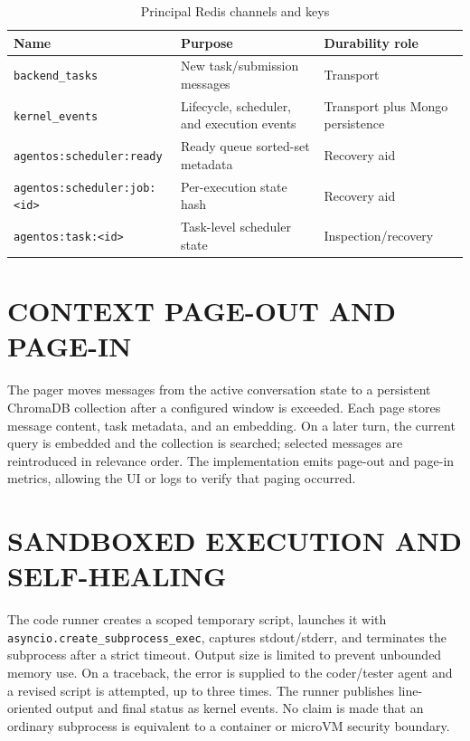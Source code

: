 \begin{table}[!htbp]
\centering
\caption{Principal Redis channels and keys}
\label{tab:rediskeys}
\begin{tabularx}{\textwidth}{|>{\centering\arraybackslash}p{}|>{\centering\arraybackslash}X|>{\centering\arraybackslash}p{}|}
\hline
\textbf{Name} & \textbf{Purpose} & \textbf{Durability role} \\ \hline
\texttt{backend\_tasks} & New task/submission messages & Transport \\ \hline
\texttt{kernel\_events} & Lifecycle, scheduler, and execution events & Transport plus Mongo persistence \\ \hline
\texttt{agentos:\allowbreak scheduler:\allowbreak ready} & Ready queue sorted-set metadata & Recovery aid \\ \hline
\texttt{agentos:\allowbreak scheduler:\allowbreak job:\allowbreak <id>} & Per-execution state hash & Recovery aid \\ \hline
\texttt{agentos:\allowbreak task:\allowbreak <id>} & Task-level scheduler state & Inspection/recovery \\ \hline
\end{tabularx}
\end{table}

\FloatBarrier
\par\vspace*{\baselineskip}
\section{\uppercase{Context Page-Out and Page-In}}
The pager moves messages from the active conversation state to a persistent ChromaDB collection after a configured window is exceeded. Each page stores message content, task metadata, and an embedding. On a later turn, the current query is embedded and the collection is searched; selected messages are reintroduced in relevance order. The implementation emits page-out and page-in metrics, allowing the UI or logs to verify that paging occurred.

\section{\uppercase{Sandboxed Execution and Self-Healing}}
The code runner creates a scoped temporary script, launches it with \texttt{asyncio.create\_subprocess\_exec}, captures stdout/stderr, and terminates the subprocess after a strict timeout. Output size is limited to prevent unbounded memory use. On a traceback, the error is supplied to the coder/tester agent and a revised script is attempted, up to three times. The runner publishes line-oriented output and final status as kernel events. No claim is made that an ordinary subprocess is equivalent to a container or microVM security boundary.
